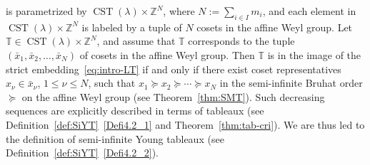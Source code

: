 \documentclass[ALCO,ThmDefs,Unicode,epreuves]{cedram}
\newcommand{\BZ}{\mathbb{Z}}
\DeclareMathOperator{\CST}{CST}
\begin{document}
is parametrized by 
$\CST (\lambda) \times \BZ^N$, 
where $N := \sum_{i \in I} m_i$, 
and each element in 
$\CST (\lambda) \times \BZ^N$
is labeled by a tuple of $N$ cosets in the affine Weyl group. 
Let $\mathbb{T} \in \CST (\lambda) \times \BZ^N$, 
and assume that $\mathbb{T}$ corresponds to the tuple 
$(\bar{x}_1 , \bar{x}_2 , \ldots , \bar{x}_N)$
of cosets in the affine Weyl group. 
Then 
$\mathbb{T}$ 
is in the image of the strict embedding~\eqref{eq:intro-LT} 
if and only if there exist coset representatives 
$x_{\nu} \in \bar{x}_{\nu}$, $1 \leq \nu \leq N$, 
such that
$x_1 \succeq x_2 \succeq \cdots \succeq x_N$ 
in the semi-infinite Bruhat order $\succeq$ on the affine Weyl group
(see Theorem~\ref{thm:SMT}). 
Such decreasing sequences are explicitly described in terms of tableaux 
(see Definition~\ref{def:SiYT}~\ref{Defi4.2_1} and Theorem~\ref{thm:tab-cri}). 
We are thus led to the definition of semi-infinite Young tableaux 
(see Definition~\ref{def:SiYT}~\ref{Defi4.2_2}).
\end{document}
